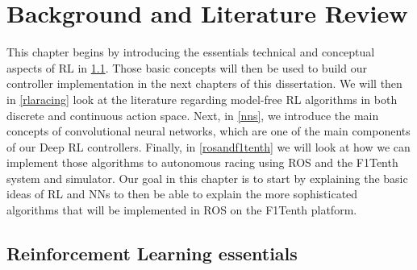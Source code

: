 
\chapter{Background and Literature Review} %

\label{Chapter2} %



This chapter begins by introducing the essentials technical and conceptual aspects of RL in \ref{back}. Those basic concepts will then be used to build our controller implementation in the next chapters of this dissertation. We will then in \ref{rlaracing} look at the literature regarding model-free RL algorithms in both discrete and continuous action space. Next, in \ref{nns}, we introduce the main concepts of convolutional neural networks, which are one of the main components of our Deep RL controllers. Finally, in \ref{rosandf1tenth} we will look at how we can implement those algorithms to autonomous racing using ROS and the F1Tenth system and simulator. \newline
Our goal in this chapter is to start by explaining the basic ideas of RL and NNs to then be able to explain the more sophisticated algorithms that will be implemented in ROS on the F1Tenth platform. \newline

\section{Reinforcement Learning essentials}
\label{back}
